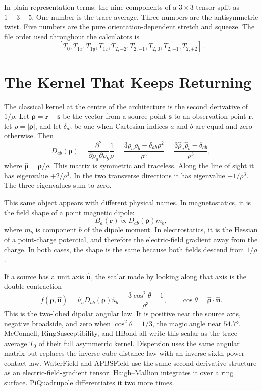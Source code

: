 \documentclass[11pt]{article}
\begin{document}
In plain representation terms: the nine components of a \(3\times3\) tensor
split as \(1+3+5\). One number is the trace average. Three numbers are the
antisymmetric twist. Five numbers are the pure orientation-dependent stretch
and squeeze. The file order used throughout the calculators is
\[
  [T_0,T_{1x},T_{1y},T_{1z},
    T_{2,-2},T_{2,-1},T_{2,0},T_{2,+1},T_{2,+2}] .
\]

\section{The Kernel That Keeps Returning}

The classical kernel at the centre of the architecture is the second derivative
of \(1/\rho\). Let \(\bm\rho=\bm r-\bm s\) be the vector from a source point
\(\bm s\) to an observation point \(\bm r\), let
\(\rho=|\bm\rho|\), and let \(\delta_{ab}\) be one when Cartesian indices
\(a\) and \(b\) are equal and zero otherwise. Then
\[
  D_{ab}(\bm\rho)
  =
  \frac{\partial^2}{\partial \rho_a\partial \rho_b}
  \frac{1}{\rho}
  =
  \frac{3\rho_a\rho_b-\delta_{ab}\rho^2}{\rho^5}
  =
  \frac{3\hat\rho_a\hat\rho_b-\delta_{ab}}{\rho^3},
\]
where \(\hat{\bm\rho}=\bm\rho/\rho\). This matrix is symmetric and traceless.
Along the line of sight it has eigenvalue \(+2/\rho^3\). In the two transverse
directions it has eigenvalue \(-1/\rho^3\). The three eigenvalues sum to zero.

This same object appears with different physical names. In magnetostatics, it
is the field shape of a point magnetic dipole:
\[
  B_a(\bm r)\propto D_{ab}(\bm\rho)m_b ,
\]
where \(m_b\) is component \(b\) of the dipole moment. In electrostatics, it is
the Hessian of a point-charge potential, and therefore the electric-field
gradient away from the charge. In both cases, the shape is the same because
both fields descend from \(1/\rho\).

If a source has a unit axis \(\hat{\bm u}\), the scalar made by looking along
that axis is the double contraction
\[
  f(\bm\rho,\hat{\bm u})
  =
  \hat u_a D_{ab}(\bm\rho)\hat u_b
  =
  \frac{3\cos^2\theta-1}{\rho^3},
  \qquad
  \cos\theta=\hat{\bm\rho}\cdot\hat{\bm u}.
\]
This is the two-lobed dipolar angular law. It is positive near the source axis,
negative broadside, and zero when \(\cos^2\theta=1/3\), the magic angle near
\(\ang{54.7}\). McConnell, RingSusceptibility, and HBond all write this scalar
as the trace average \(T_0\) of their full asymmetric kernel. Dispersion uses
the same angular matrix but replaces the inverse-cube distance law with an
inverse-sixth-power contact law. WaterField and APBSField use the same
second-derivative structure as an electric-field-gradient tensor. Haigh--Mallion
integrates it over a ring surface. PiQuadrupole differentiates it two more
times.
\end{document}
